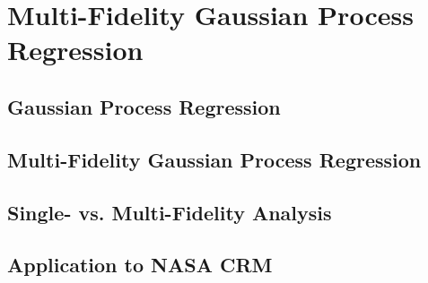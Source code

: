 \chapter{Multi-Fidelity Gaussian Process Regression}

\section{Gaussian Process Regression}

\section{Multi-Fidelity Gaussian Process Regression}

\section{Single- vs. Multi-Fidelity Analysis}

\section{Application to NASA CRM}